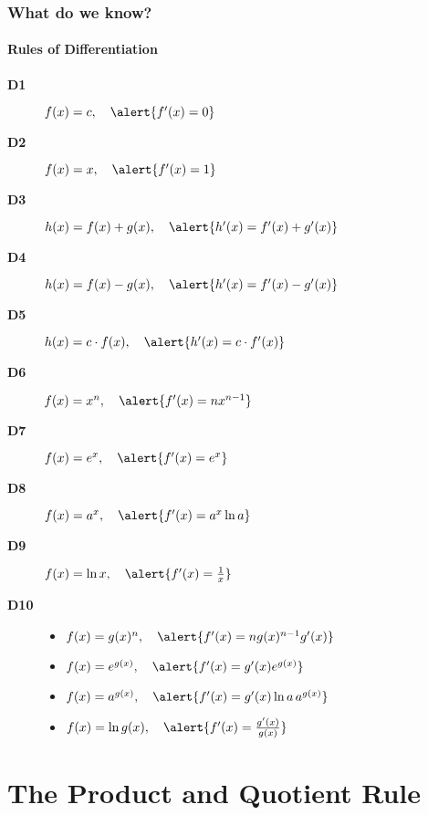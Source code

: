 \documentclass[9pt,xcolor=x11names,compress]{beamer}
\begin{document}
\begin{frame}\frametitle{What do we know?}
\framesubtitle{Rules of Differentiation}
\begin{description}
	\item[\textbf{D1}] $f(x)=c,\quad \alert{f'(x)=0}$
	\item[\textbf{D2}] $f(x)=x,\quad \alert{f'(x)=1}$
	\item[\textbf{D3}] $h(x)=f(x)+g(x),\quad \alert{h'(x)=f'(x)+g'(x)}$
	\item[\textbf{D4}] $h(x)=f(x)-g(x),\quad \alert{h'(x)=f'(x)-g'(x)}$
	\item[\textbf{D5}] $h(x)=c\cdot f(x),\quad \alert{h'(x)=c\cdot f'(x)}$
	\item[\textbf{\alert{D6}}] $f(x)=x^n,\quad \alert{f'(x)=nx^{n-1}}$
	\item[\textbf{\alert{D7}}] $f(x)=e^x,\quad \alert{f'(x)=e^x}$
	\item[\textbf{\alert{D8}}] $f(x)=a^x,\quad \alert{f'(x)=a^x \ln a}$
	\item[\textbf{\alert{D9}}] $f(x)=\ln x,\quad \alert{f'(x)=\tfrac{1}{x}}$
	\item[\textbf{D10}] 
	\begin{itemize}
		\item $f(x)=g(x)^n,\quad \alert{f'(x)=ng(x)^{n-1}g'(x)}$
		\item $f(x)=e^{g(x)},\quad \alert{f'(x)=g'(x)e^{g(x)}}$
		\item $f(x)=a^{g(x)},\quad \alert{f'(x)=g'(x)\ln a\,a^{g(x)}}$
		\item $f(x)=\ln g(x),\quad \alert{f'(x)=\frac{g'(x)}{g(x)}}$
	\end{itemize}
\end{description}
\end{frame}

\section{The Product and Quotient Rule}
\end{document}

